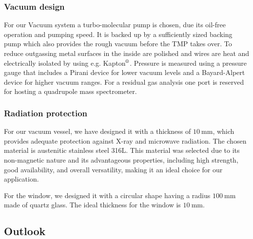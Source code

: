 \subsubsection{Vacuum design}


For our Vacuum system a turbo-molecular pump is chosen, due its oil-free operation and pumping speed.
It is backed up by a sufficiently sized backing pump which also provides the rough vacuum before the TMP takes over.
To reduce outgassing metal surfaces in the inside are polished and wires are heat and electrically isolated by using e.g. Kapton$\textsuperscript{\textregistered}$.
Pressure is measured using a pressure gauge that includes a Pirani device for lower vacuum levels and a Bayard-Alpert device for higher vacuum ranges.
For a residual gas analysis one port is reserved for hosting a quadrupole mass spectrometer.


\subsubsection{Radiation protection}

For our vacuum vessel, we have designed it with a thickness of $\SI{10}{\milli\meter}$, which provides adequate protection against X-ray and microwave radiation. The chosen material is austenitic stainless steel 316L. This material was selected due to its non-magnetic nature and its advantageous properties, including high strength, good availability, and overall versatility, making it an ideal choice for our application.

For the window, we designed it with a circular shape having a radius $\SI{100}{\milli\meter}$ made of quartz glass. The ideal thickness for the window is $\SI{10}{\milli\meter}$.


\subsection{Outlook}

